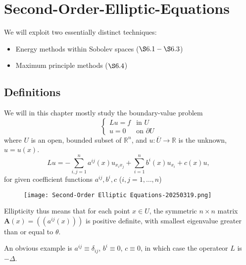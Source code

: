 \section{Second-Order-Elliptic-Equations}

We will exploit two essentially distinct techniques:

\begin{itemize}
	\item Energy methods within Sobolev spaces ($\S 6.1-\S 6.3$)
	\item Maximum principle methods ($\S 6.4$)
\end{itemize}

\subsection{Definitions}

We will in this chapter mostly study the boundary-value problem
\[
\begin{cases}
Lu=f & \text{in }U \\
u=0 & \text{on }\partial U
\end{cases}
\]
where $U$ is an open, bounded subset of $\mathbb{R}^{n}$, and $u:\overline{U}\to \mathbb{R}$ is the unknown, $u=u(x)$.
\[
L u=-\sum_{i, j=1}^n a^{i j}(x) u_{x_i x_j}+\sum_{i=1}^n b^i(x) u_{x_i}+c(x) u,
\]
for given coefficient functions $a^{ij},b^{i},c$ ($i,j=1,\dots,n$)

\begin{definition}[elliptic]
\begin{figure}[H]
\centering
\texttt{[image: Second-Order Elliptic Equations-20250319.png]}
\label{}
\end{figure}
\end{definition}
Ellipticity thus means that for each point $x \in U$, the symmetric $n \times n$ matrix $\mathbf{A}(x)=\left(\left(a^{i j}(x)\right)\right)$ is positive definite, with smallest eigenvalue greater than or equal to $\theta$.

An obvious example is $a^{ij}\equiv\delta _{ij}$, $b^{i}\equiv0$, $c\equiv0$, in which case the operateor $L$ is $-\Delta$.
